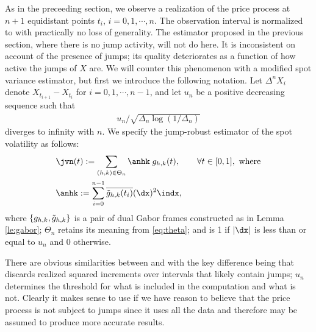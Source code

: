 As in the preceeding section, we observe a realization of the price process at $n + 1$ equidistant points $t_i$,  $i = 0, 1, \cdots, n$. The observation interval is normalized to \domain with practically no loss of generality.  The estimator proposed in the previous section, where there is no jump activity, will not do here. It is inconsistent on account of the presence of jumps; its quality deteriorates as a function of how active the jumps of $X$ are. We will counter this phenomenon with a modified spot variance estimator, but first we introduce the following notation. Let $\Delta^nX_i$ denote $X_{t_{i+1}} - X_{t_i}$ for $i = 0, 1,\cdots, n-1$, and let $u_n$  be a positive decreasing sequence such that 
\begin{align}
u_n/\sqrt{\Delta_n\log(1/\Delta_n)}  
  \label{}
\end{align}
 diverges to infinity with $n$. We specify the jump-robust estimator of the spot volatility as follows: 
\begin{align}
  \label{eq:jumpvolestimator}
  &\jvn(t) := \sum_{(h,k) \in \Theta_n} \anhk\;g_{h,k}(t), \qquad \forall t \in [0,1], \text{ where}\\
  &\anhk := \sum_{i =0}^{n-1} \btghki (\dx)^2 \indx,
\end{align}
where $\{g_{h,k}, \tilde{g}_{h,k}\}$ is a pair of dual Gabor frames constructed as in Lemma \eqref{le:gabor}; $\Theta_n$ retains its meaning from \eqref{eq:theta}; and \indx is 1 if $\vert\dx\vert$ is less than or equal to  $u_n$ and 0 otherwise.  

There are obvious similarities between \svnx and \jvn with the key difference being that \jvn discards realized squared increments over intervals that likely contain jumps; $u_n$ determines the threshold for what is included in the computation and what is not. Clearly it makes sense to use \svnx if we have reason to believe that the price process is not subject to jumps since it uses all the data and therefore may be assumed to produce more accurate results.  
